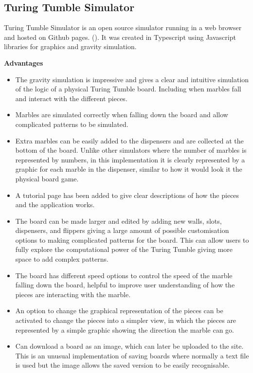 \documentclass{l4proj}
\begin{document}
\subsection{Turing Tumble Simulator}
Turing Tumble Simulator is an open source simulator running in a web browser and hosted on Github pages. (\cite{turing_tumble_simulator}). It was created in Typescript using Javascript libraries for graphics and gravity simulation. 

\textbf{Advantages}
\begin{itemize}
    \item The gravity simulation is impressive and gives a clear and intuitive simulation of the logic of a physical Turing Tumble board. Including when marbles fall and interact with the different pieces.
    \item Marbles are simulated correctly when falling down the board and allow complicated patterns to be simulated.
    \item Extra marbles can be easily added to the dispensers and are collected at the bottom of the board. Unlike other simulators where the number of marbles is represented by numbers, in this implementation it is clearly represented by a graphic for each marble in the dispenser, similar to how it would look it the physical board game.
    \item A tutorial page has been added to give clear descriptions of how the pieces and the application works.
    \item The board can be made larger and edited by adding new walls, slots, dispensers, and flippers giving a large amount of possible customisation options to making complicated patterns for the board. This can allow users to fully explore the computational power of the Turing Tumble giving more space to add complex patterns.
    \item The board has different speed options to control the speed of the marble falling down the board, helpful to improve user understanding of how the pieces are interacting with the marble.
    \item An option to change the graphical representation of the pieces can be activated to change the pieces into a simpler view, in which the pieces are represented by a simple graphic showing the direction the marble can go.
    \item Can download a board as an image, which can later be uploaded to the site. This is an unusual implementation of saving boards where normally a text file is used but the image allows the saved version to be easily recognisable.
\end{itemize}
\end{document}
